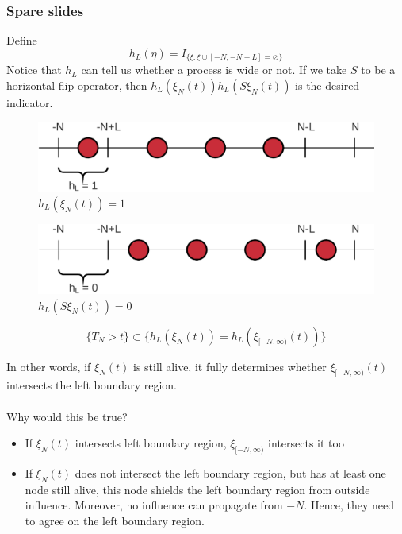 \documentclass{beamer}
\begin{document}
\begin{frame}
    \frametitle{Spare slides}
\end{frame}

\begin{frame}
    Define \[h_L(\eta) = I_{\{\xi : \xi \cup [-N, -N+L] = \varnothing\}}\]
    Notice that $h_L$ can tell us whether a process is wide or not.
    If we take $S$ to be a horizontal flip operator, then $h_L(\xi_N(t))h_L(S\xi_N(t))$ is the desired indicator.
    \begin{figure}[H]
        \centering
        \includegraphics[scale=0.15]{./img/narrow_flip_ex_1.png}
        \caption{$h_L(\xi_N(t)) = 1$}
        \label{fig:narrow_flip_1}
    \end{figure}
    \begin{figure}[H]
        \centering
        \includegraphics[scale=0.15]{./img/narrow_flip_ex_2.png}
        \caption{$h_L(S\xi_N(t)) = 0$}
        \label{fig:narrow_flip_2}
    \end{figure}

\end{frame}

\begin{frame}
    \begin{lemma}
        \[\{T_N > t\} \subset \{h_L(\xi_N(t)) = h_L(\xi_{[-N, \infty)}(t))\}\]
    \end{lemma}
    In other words, if $\xi_N(t)$ is still alive, it fully determines whether $\xi_{[-N, \infty)}(t)$ intersects the left boundary region.
    \\~\\
    Why would this be true?
    \begin{itemize}
        \item If $\xi_N(t)$ intersects left boundary region, $\xi_{[-N, \infty)}$ intersects it too
        \item If $\xi_N(t)$ does not intersect the left boundary region, but has at least one node still alive, this node shields the left boundary region from outside influence.
            Moreover, no influence can propagate from $-N$. Hence, they need to agree on the left boundary region.
    \end{itemize}
\end{frame}
\end{document}
